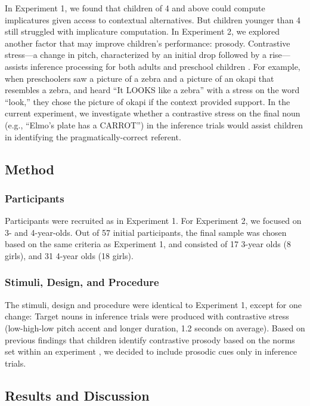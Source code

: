 \documentclass[10pt,letterpaper]{article}
\begin{document}
In Experiment 1, we found that children of 4 and above could compute implicatures given access to contextual alternatives. But children younger than 4 still struggled with implicature computation. In Experiment 2, we explored another factor that may improve children's performance: prosody. Contrastive stress---a change in pitch, characterized by an initial drop followed by a rise--- assists inference processing for both adults \cite{ito2008anticipatory} and preschool children \cite{kurumada1contextual}. For example, when preschoolers saw a picture of a zebra and a picture of an okapi that resembles a zebra, and heard ``It LOOKS like a zebra'' with a stress on the word ``look,'' they chose the picture of okapi if the context provided support. In the current experiment, we investigate whether a contrastive stress on the final noun (e.g., ``Elmo's plate has a CARROT'') in the inference trials would assist children in identifying the pragmatically-correct referent.

\subsection{Method}

\subsubsection{Participants}

Participants were recruited as in Experiment 1. For Experiment 2, we focused on 3- and 4-year-olds. Out of 57 initial participants, the final sample was chosen based on the same criteria as Experiment 1, and consisted of 17 3-year olds (8 girls), and 31 4-year olds (18 girls).

\subsubsection{Stimuli, Design, and Procedure}

The stimuli, design and procedure were identical to Experiment 1, except for one change: Target nouns in inference trials were produced with contrastive stress (low-high-low pitch accent and longer duration, 1.2 seconds on average). Based on previous findings that children identify contrastive prosody based on the norms set within an experiment \cite{kurumada1contextual}, we decided to include prosodic cues only in inference trials. 

\subsection{Results and Discussion}
\end{document}
